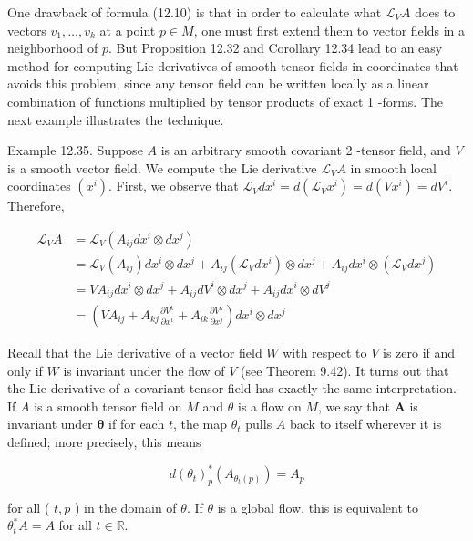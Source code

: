 \documentclass[10pt, letterpaper]{article}
\begin{document}
One drawback of formula (12.10) is that in order to calculate what $\mathscr{L}_{V} A$ does to vectors $v_{1}, \ldots, v_{k}$ at a point $p \in M$, one must first extend them to vector fields in a neighborhood of $p$. But Proposition 12.32 and Corollary 12.34 lead to an easy method for computing Lie derivatives of smooth tensor fields in coordinates that avoids this problem, since any tensor field can be written locally as a linear combination of functions multiplied by tensor products of exact 1 -forms. The next example illustrates the technique.

Example 12.35. Suppose $A$ is an arbitrary smooth covariant 2 -tensor field, and $V$ is a smooth vector field. We compute the Lie derivative $\mathscr{L}_{V} A$ in smooth local coordinates $\left(x^{i}\right)$. First, we observe that $\mathscr{L}_{V} d x^{i}=d\left(\mathscr{L}_{V} x^{i}\right)=d\left(V x^{i}\right)=d V^{i}$. Therefore,

$$
\begin{aligned}
\mathscr{L}_{V} A & =\mathscr{L}_{V}\left(A_{i j} d x^{i} \otimes d x^{j}\right) \\
& =\mathscr{L}_{V}\left(A_{i j}\right) d x^{i} \otimes d x^{j}+A_{i j}\left(\mathscr{L}_{V} d x^{i}\right) \otimes d x^{j}+A_{i j} d x^{i} \otimes\left(\mathscr{L}_{V} d x^{j}\right) \\
& =V A_{i j} d x^{i} \otimes d x^{j}+A_{i j} d V^{i} \otimes d x^{j}+A_{i j} d x^{i} \otimes d V^{j} \\
& =\left(V A_{i j}+A_{k j} \frac{\partial V^{k}}{\partial x^{i}}+A_{i k} \frac{\partial V^{k}}{\partial x^{j}}\right) d x^{i} \otimes d x^{j}
\end{aligned}
$$

Recall that the Lie derivative of a vector field $W$ with respect to $V$ is zero if and only if $W$ is invariant under the flow of $V$ (see Theorem 9.42). It turns out that the Lie derivative of a covariant tensor field has exactly the same interpretation. If $A$ is a smooth tensor field on $M$ and $\theta$ is a flow on $M$, we say that $\boldsymbol{A}$ is invariant under $\boldsymbol{\theta}$ if for each $t$, the map $\theta_{t}$ pulls $A$ back to itself wherever it is defined; more precisely, this means

$$
d\left(\theta_{t}\right)_{p}^{*}\left(A_{\theta_{t}(p)}\right)=A_{p}
$$

for all ( $t, p$ ) in the domain of $\theta$. If $\theta$ is a global flow, this is equivalent to $\theta_{t}^{*} A=A$ for all $t \in \mathbb{R}$.
\end{document}
